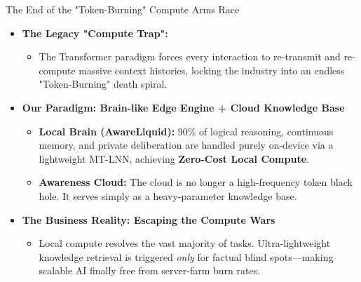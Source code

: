 ﻿\documentclass[aspectratio=169, 10pt]{beamer}
\begin{document}
\begin{frame}{The End of the "Token-Burning" Compute Arms Race}
\begin{itemize}
    \item \textbf{The Legacy "Compute Trap":} 
    \begin{itemize}
        \item The Transformer paradigm forces every interaction to re-transmit and re-compute massive context histories, locking the industry into an endless "Token-Burning" death spiral.
    \end{itemize}
    \vspace{0.4em}
    \item \textbf{Our Paradigm: Brain-like Edge Engine + Cloud Knowledge Base}
    \begin{itemize}
        \item \textbf{Local Brain (AwareLiquid):} 90\% of logical reasoning, continuous memory, and private deliberation are handled purely on-device via a lightweight MT-LNN, achieving \textbf{Zero-Cost Local Compute}.
        \item \textbf{Awareness Cloud:} The cloud is no longer a high-frequency token black hole. It serves simply as a heavy-parameter knowledge base.
    \end{itemize}
    \vspace{0.4em}
    \item \textbf{The Business Reality: Escaping the Compute Wars} 
    \begin{itemize}
        \item Local compute resolves the vast majority of tasks. Ultra-lightweight knowledge retrieval is triggered \textit{only} for factual blind spots—making scalable AI finally free from server-farm burn rates.
    \end{itemize}
\end{itemize}
\end{frame}
\end{document}
